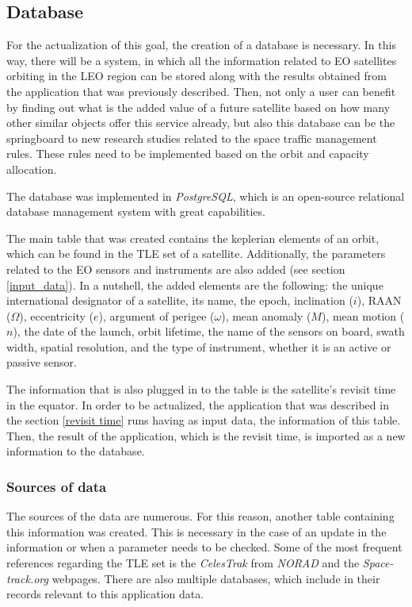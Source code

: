 \bigskip
\subsection{Database}
\bigskip

For the actualization of this goal, the creation of a database is necessary. In this way, there will be a system, in which all the information related to EO satellites orbiting in the LEO region can be stored along with the results obtained from the application that was previously described. Then, not only a user can benefit by finding out what is the added value of a future satellite based on how many other similar objects offer this service already, but also this database can be the springboard to new research studies related to the space traffic management rules. These rules need to be implemented based on the orbit and capacity allocation.

\bigskip
The database was implemented in \textit{PostgreSQL}, which is an open-source relational database management system with great capabilities.  

The main table that was created contains the keplerian elements of an orbit, which can be found in the TLE set of a satellite. Additionally, the parameters related to the EO sensors and instruments are also added (see section \ref{input_data}). In a nutshell, the added elements are the following: the unique international designator of a satellite, its name, the epoch, inclination ($i$), RAAN ($\Omega$), eccentricity ($e$), argument of perigee ($\omega$), mean anomaly ($M$), mean motion ($n$), the date of the launch, orbit lifetime, the name of the sensors on board, swath width, spatial resolution, and the type of instrument, whether it is an active or passive sensor.

The information that is also plugged in to the table is the satellite's revisit time in the equator. In order to be actualized, the application that was described in the section \ref{revisit time} runs having as input data, the information of this table. Then, the result of the application, which is the revisit time, is imported as a new information to the database.

\bigskip
\subsubsection{Sources of data}
\bigskip

The sources of the data are numerous. For this reason, another table containing this information was created. This is necessary in the case of an update in the information or when a parameter needs to be checked. Some of the most frequent references regarding the TLE set is the \textit{CelesTrak} from \textit{NORAD} and the \textit{Space-track.org} webpages. There are also multiple databases, which include in their records relevant to this application data.


